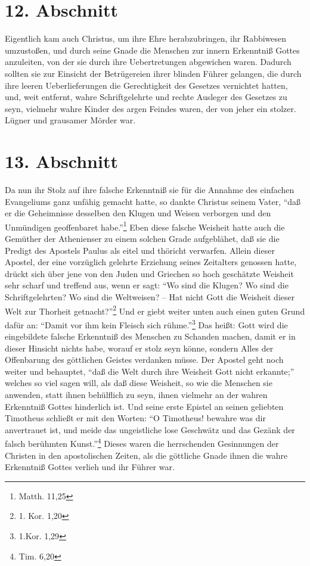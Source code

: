 \section{12. Abschnitt} \label{kap7_ab12}

Eigentlich kam auch Christus, um ihre Ehre herabzubringen, ihr Rabbiwesen
umzustoßen, und durch seine Gnade die Menschen zur innern Erkenntniß Gottes
anzuleiten, von der sie durch ihre Uebertretungen abgewichen waren. Dadurch
sollten sie zur Einsicht der Betrügereien ihrer blinden Führer gelangen, die
durch ihre leeren Ueberlieferungen die Gerechtigkeit des Gesetzes vernichtet
hatten, und, weit entfernt, wahre Schriftgelehrte und rechte Ausleger des
Gesetzes zu seyn, vielmehr wahre Kinder des argen Feindes waren, der von jeher
ein stolzer. Lügner und grausamer Mörder war.

\section{13. Abschnitt} \label{kap7_ab13}

Da nun ihr Stolz auf ihre falsche Erkenntniß sie für die Annahme des einfachen
Evangeliums ganz unfähig gemacht hatte, so dankte Christus seinem Vater, "`daß
er die Geheimnisse desselben den Klugen und Weisen verborgen und den Unmündigen
geoffenbaret habe."'\footnote{Matth. 11,25} Eben diese falsche Weisheit hatte
auch die Gemüther der Athenienser zu einem solchen Grade aufgeblähet, daß sie
die Predigt des Apostels Paulus als eitel und thöricht verwarfen. Allein dieser
Apostel, der eine vorzüglich gelehrte Erziehung seines Zeitalters genossen
hatte, drückt sich über jene von den Juden und Griechen so hoch geschätzte
Weisheit sehr scharf und treffend aus, wenn er sagt: "`Wo sind die Klugen? Wo
sind die Schriftgelehrten? Wo sind die Weltweisen? -- Hat nicht Gott die
Weisheit dieser Welt zur Thorheit getnacht?"'\footnote{1. Kor. 1,20} Und er
giebt weiter unten auch einen guten Grund dafür an: "`Damit vor ihm kein Fleisch
sich rühme."'\footnote{1.Kor. 1,29} Das heißt: Gott wird die eingebildete
falsche Erkenntniß des Menschen zu Schanden machen, damit er in dieser Hinsicht
nichts habe, worauf er stolz seyn könne, sondern Alles der Offenbarung des
göttlichen Geistes verdanken müsse. Der Apostel geht noch weiter und behauptet,
"`daß die Welt durch ihre Weisheit Gott nicht erkannte;"' welches so viel sagen
will, als daß diese Weisheit, so wie die Menschen sie anwenden, statt ihnen
behülflich zu seyn, ihnen vielmehr an der wahren Erkenntniß Gottes hinderlich
ist. Und seine erste Epistel an seinen geliebten Timotheus schließt er mit den
Worten: "`O Timotheus! bewahre was dir anvertrauet ist, und meide das
ungeistliche lose Geschwätz und das Gezänk der falsch berühmten
Kunst."'\footnote{Tim. 6,20} Dieses waren die herrschenden Gesinnungen der
Christen in den apostolischen Zeiten, als die göttliche Gnade ihnen die wahre
Erkenntniß Gottes verlieh und ihr Führer war.

